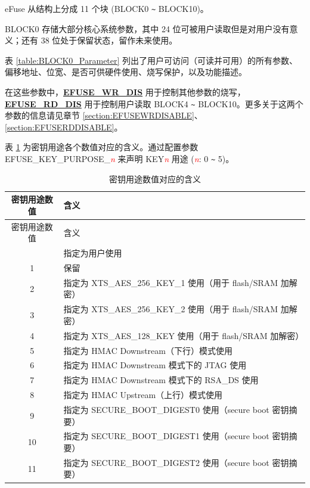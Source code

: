 \documentclass[main\_\_CN.tex]{subfiles}
\begin{document}
eFuse 从结构上分成 11 个块 (BLOCK0 \verb+~+ BLOCK10)。

BLOCK0 存储大部分核心系统参数，其中 24 位可被用户读取但是对用户没有意义；还有 38 位处于保留状态，留作未来使用。


表 \ref{table:BLOCK0_Parameter} 列出了用户可访问（可读并可用）的所有参数、偏移地址、位宽、是否可供硬件使用、烧写保护，以及功能描述。

在这些参数中，{\bfseries \hyperref[fielddesc:EFUSEWRDIS]{EFUSE\_WR\_DIS}} 用于控制其他参数的烧写，{\bfseries \hyperref[fielddesc:EFUSERDDIS]{EFUSE\_RD\_DIS}} 用于控制用户读取 BLOCK4 \verb+~+ BLOCK10。更多关于这两个参数的信息请见章节 \ref{section:EFUSEWRDISABLE}、\ref{section:EFUSERDDISABLE}。

\clearpage
\begin{landscape}



\end{landscape}
\restoregeometry
\clearpage

表 \ref{table: key_purpose} 为密钥用途各个数值对应的含义。通过配置参数 EFUSE\_KEY\_PURPOSE\_\textcolor{red}{\it{n}} 来声明 KEY\textcolor{red}{\it{n}} 用途 (\textcolor{red}{\it{n}}: 0 \verb+~+ 5)。

\begin{longtable}[c]{|c|p{10cm}|}
\caption{密钥用途数值对应的含义}
\label{table: key_purpose}
    \\\hline
    \rowcolor{lightgray}
  密钥用途数值  & 含义\\
    \endfirsthead
    \hline
    \rowcolor{lightgray}
   密钥用途数值  & 含义\\
    \endhead
    \endfoot
    \endlastfoot
    \hline
0 & 指定为用户使用 \\\hline
1&  保留 \\\hline
2& 指定为 XTS\_AES\_256\_KEY\_1 使用（用于 flash/SRAM 加解密） \\\hline
3& 指定为 XTS\_AES\_256\_KEY\_2 使用（用于 flash/SRAM 加解密） \\ \hline
4 & 指定为 XTS\_AES\_128\_KEY 使用（用于 flash/SRAM 加解密） \\\hline
5& 指定为 HMAC Downstream（下行）模式使用\\\hline
6& 指定为 HMAC Downstream 模式下的 JTAG 使用 \\\hline
7 & 指定为 HMAC Downstream 模式下的 RSA\_DS 使用\\\hline
8 &指定为 HMAC Upstream（上行）模式使用\\\hline
9& 指定为 SECURE\_BOOT\_DIGEST0 使用（secure boot 密钥摘要） \\\hline
10 &指定为 SECURE\_BOOT\_DIGEST1 使用（secure boot 密钥摘要）\\\hline
11& 指定为 SECURE\_BOOT\_DIGEST2 使用（secure boot 密钥摘要）\\\hline
\end{longtable}
\end{document}
